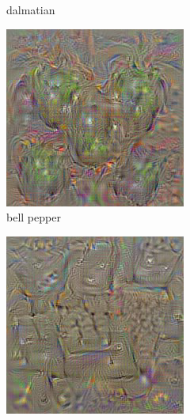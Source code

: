 \begin{figure}[t]
\begin{subfigure}[b]{0.3\textwidth}
    \caption{dalmatian}
    \label{fig:sec:context:deep-visualization-class-2}
  \end{subfigure}
  \hfill
  \begin{subfigure}[b]{0.3\textwidth}
    \includegraphics[width=\textwidth]{gfx/deep-visualization-class-3}
    \caption{bell pepper}
    \label{fig:sec:context:deep-visualization-class-3}
  \end{subfigure}
  \par\medskip
  \begin{subfigure}[b]{0.3\textwidth}
    \includegraphics[width=\textwidth]{gfx/deep-visualization-class-4}

\end{subfigure}
\end{figure}
